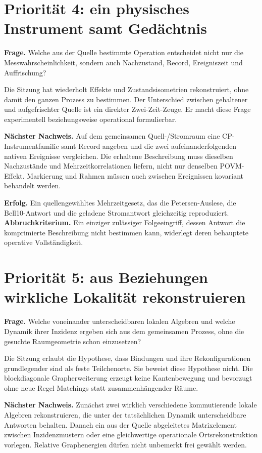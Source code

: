 \documentclass[11pt,a4paper,oneside,parskip=half,headings=normal,numbers=noenddot,bibliography=totoc]{scrreprt}
\begin{document}
\section{Priorität 4: ein physisches Instrument samt Gedächtnis}
\textbf{Frage.} Welche aus der Quelle bestimmte Operation entscheidet nicht nur die Messwahrscheinlichkeit, sondern auch Nachzustand, Record, Ereigniszeit und Auffrischung?

Die Sitzung hat wiederholt Effekte und Zustandsisometrien rekonstruiert, ohne damit den ganzen Prozess zu bestimmen. Der Unterschied zwischen gehaltener und aufgefrischter Quelle ist ein direkter Zwei-Zeit-Zeuge. Er macht diese Frage experimentell beziehungsweise operational formulierbar.

\textbf{Nächster Nachweis.} Auf dem gemeinsamen Quell-/Stromraum eine CP-Instrumentfamilie samt Record angeben und die zwei aufeinanderfolgenden nativen Ereignisse vergleichen. Die erhaltene Beschreibung muss dieselben Nachzustände und Mehrzeitkorrelationen liefern, nicht nur denselben POVM-Effekt. Markierung und Rahmen müssen auch zwischen Ereignissen kovariant behandelt werden.

\textbf{Erfolg.} Ein quellengewähltes Mehrzeitgesetz, das die Petersen-Auslese, die Bell10-Antwort und die geladene Stromantwort gleichzeitig reproduziert. \textbf{Abbruchkriterium.} Ein einziger zulässiger Folgeeingriff, dessen Antwort die komprimierte Beschreibung nicht bestimmen kann, widerlegt deren behauptete operative Vollständigkeit.

\section{Priorität 5: aus Beziehungen wirkliche Lokalität rekonstruieren}
\textbf{Frage.} Welche voneinander unterscheidbaren lokalen Algebren und welche Dynamik ihrer Inzidenz ergeben sich aus dem gemeinsamen Prozess, ohne die gesuchte Raumgeometrie schon einzusetzen?

Die Sitzung erlaubt die Hypothese, dass Bindungen und ihre Rekonfigurationen grundlegender sind als feste Teilchenorte. Sie beweist diese Hypothese nicht. Die blockdiagonale Grapherweiterung erzeugt keine Kantenbewegung und bevorzugt ohne neue Regel Matchings statt zusammenhängender Räume.

\textbf{Nächster Nachweis.} Zunächst zwei wirklich verschiedene kommutierende lokale Algebren rekonstruieren, die unter der tatsächlichen Dynamik unterscheidbare Antworten behalten. Danach ein aus der Quelle abgeleitetes Matrixelement zwischen Inzidenzmustern oder eine gleichwertige operationale Ortsrekonstruktion vorlegen. Relative Graphenergien dürfen nicht unbemerkt frei gewählt werden.
\end{document}
